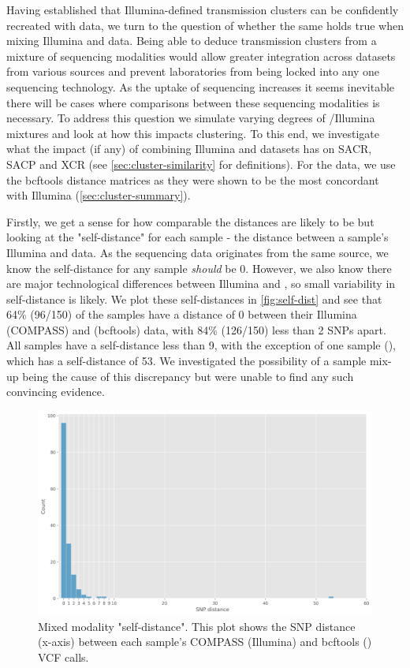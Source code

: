Having established that Illumina-defined transmission clusters can be confidently recreated with \ont{} data, we turn to the question of whether the same holds true when mixing Illumina and \ont{} data. Being able to deduce transmission clusters from a mixture of sequencing modalities would allow greater integration across datasets from various sources and prevent laboratories from being locked into any one sequencing technology. As the uptake of \ont{} sequencing increases it seems inevitable there will be cases where comparisons between these sequencing modalities is necessary. To address this question we simulate varying degrees of \ont{}/Illumina mixtures and look at how this impacts clustering. To this end, we investigate what the impact (if any) of combining Illumina and \ont{} datasets has on SACR, SACP and XCR (see \autoref{sec:cluster-similarity} for definitions). For the \ont{} data, we use the bcftools distance matrices as they were shown to be the most concordant with Illumina (\autoref{sec:cluster-summary}).

Firstly, we get a sense for how comparable the distances are likely to be but looking at the "self-distance" for each sample - the distance between a sample's Illumina and \ont{} data.  As the sequencing data originates from the same source, we know the self-distance for any sample \emph{should} be 0. However, we also know there are major technological differences between Illumina and \ont{}, so small variability in self-distance is likely. We plot these self-distances in \autoref{fig:self-dist} and see that 64\% (96/150) of the samples have a distance of 0 between their Illumina (COMPASS) and \ont{} (bcftools) data, with 84\% (126/150) less than 2 SNPs apart. All samples have a self-distance less than 9, with the exception of one sample (), which has a self-distance of 53. We investigated the possibility of a sample mix-up being the cause of this discrepancy but were unable to find any such convincing evidence. 

\begin{figure}
\begin{center}
\includegraphics[width=0.90\columnwidth]{Chapter2/Figs/mixed_self_dist.png}
\caption{{Mixed modality "self-distance". This plot shows the SNP distance (x-axis) between each sample's COMPASS (Illumina) and bcftools (\ont{}) VCF calls.
\label{fig:self-dist}
}}
\end{center}
\end{figure}

